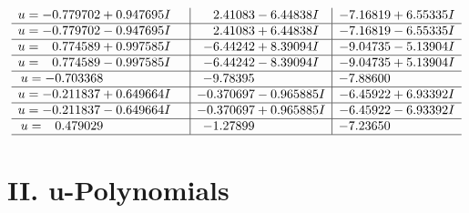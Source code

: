 \documentclass[1p]{elsarticle_modified}
\theoremstyle{definition}
\begin{document}
$$\begin{array}{c|c|c}
\begin{aligned}
u &= -0.779702 + 0.947695 I\end{aligned}
 & \phantom{-}2.41083 - 6.44838 I & -7.16819 + 6.55335 I \\ \hline\begin{aligned}
u &= -0.779702 - 0.947695 I\end{aligned}
 & \phantom{-}2.41083 + 6.44838 I & -7.16819 - 6.55335 I \\ \hline\begin{aligned}
u &= \phantom{-}0.774589 + 0.997585 I\end{aligned}
 & -6.44242 + 8.39094 I & -9.04735 - 5.13904 I \\ \hline\begin{aligned}
u &= \phantom{-}0.774589 - 0.997585 I\end{aligned}
 & -6.44242 - 8.39094 I & -9.04735 + 5.13904 I \\ \hline\begin{aligned}
u &= -0.703368\phantom{ +0.000000I}\end{aligned}
 & -9.78395\phantom{ +0.000000I} & -7.88600\phantom{ +0.000000I} \\ \hline\begin{aligned}
u &= -0.211837 + 0.649664 I\end{aligned}
 & -0.370697 - 0.965885 I & -6.45922 + 6.93392 I \\ \hline\begin{aligned}
u &= -0.211837 - 0.649664 I\end{aligned}
 & -0.370697 + 0.965885 I & -6.45922 - 6.93392 I \\ \hline\begin{aligned}
u &= \phantom{-}0.479029\phantom{ +0.000000I}\end{aligned}
 & -1.27899\phantom{ +0.000000I} & -7.23650\phantom{ +0.000000I}\\
 \hline 
 \end{array}$$\newpage
\newpage\renewcommand{\arraystretch}{1}
\centering \section*{ II. u-Polynomials}
\end{document}
